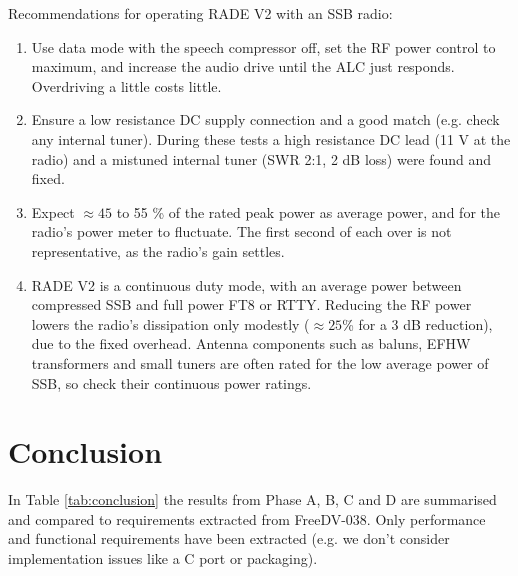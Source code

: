 \documentclass{article}
\begin{document}
\noindent Recommendations for operating RADE V2 with an SSB radio:
\begin{enumerate}
\item Use data mode with the speech compressor off, set the RF power control to maximum, and increase the audio drive until the ALC just responds.  Overdriving a little costs little.
\item Ensure a low resistance DC supply connection and a good match (e.g. check any internal tuner).  During these tests a high resistance DC lead (11 \si{V} at the radio) and a mistuned internal tuner (SWR 2:1, 2 \si{dB} loss) were found and fixed.
\item Expect $\approx 45$ to 55 \si{\%} of the rated peak power as average power, and for the radio's power meter to fluctuate.  The first second of each over is not representative, as the radio's gain settles.
\item RADE V2 is a continuous duty mode, with an average power between compressed SSB and full power FT8 or RTTY.  Reducing the RF power lowers the radio's dissipation only modestly ($\approx 25$\% for a 3 \si{dB} reduction), due to the fixed overhead.  Antenna components such as baluns, EFHW transformers and small tuners are often rated for the low average power of SSB, so check their continuous power ratings.
\end{enumerate}

\section{Conclusion}

In Table \ref{tab:conclusion} the results from Phase A, B, C and D are summarised and compared to requirements extracted from FreeDV-038.  Only performance and functional requirements have been extracted (e.g. we don't consider implementation issues like a C port or packaging).
\end{document}
